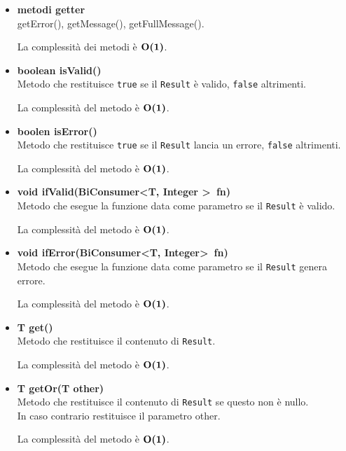 \documentclass[a4paper, 12pt]{scrreprt}
\begin{document}
				\begin{itemize}
					\item \textbf{metodi getter}
					\\getError(), getMessage(), getFullMessage().

					La complessit\`a dei metodi \`e $\mathbf{O}\textbf{(1)}$.

					\item\textbf{boolean isValid()}
					\\Metodo che restituisce \verb!true! se il \verb!Result! \`e valido, \verb!false! altrimenti.

					La complessit\`a del metodo \`e $\mathbf{O}\textbf{(1)}$.

					\item\textbf{boolen isError()}
					\\Metodo che restituisce \verb!true! se il \verb!Result! lancia un errore, \verb!false! altrimenti.

					La complessit\`a del metodo \`e $\mathbf{O}\textbf{(1)}$.

					\item\textbf{void ifValid(BiConsumer\textless T, Integer \textgreater~fn)}
					\\Metodo che esegue la funzione data come parametro se il \verb!Result! \`e valido.

					La complessit\`a del metodo \`e $\mathbf{O}\textbf{(1)}$.

					\item\textbf{void ifError(BiConsumer\textless T, Integer\textgreater~fn)}
					\\Metodo che esegue la funzione data come parametro se il \verb!Result! genera errore.

					La complessit\`a del metodo \`e $\mathbf{O}\textbf{(1)}$.

					\item \textbf{T get()}
					\\Metodo che restituisce il contenuto di \verb!Result!.

					La complessit\`a del metodo \`e $\mathbf{O}\textbf{(1)}$.

					\item \textbf{T getOr(T other)}
					\\Metodo che restituisce il contenuto di \verb!Result! se questo non \`e nullo.
					\\ In caso contrario restituisce il parametro other.

					La complessit\`a del metodo \`e $\mathbf{O}\textbf{(1)}$.


\end{itemize}
\end{document}
